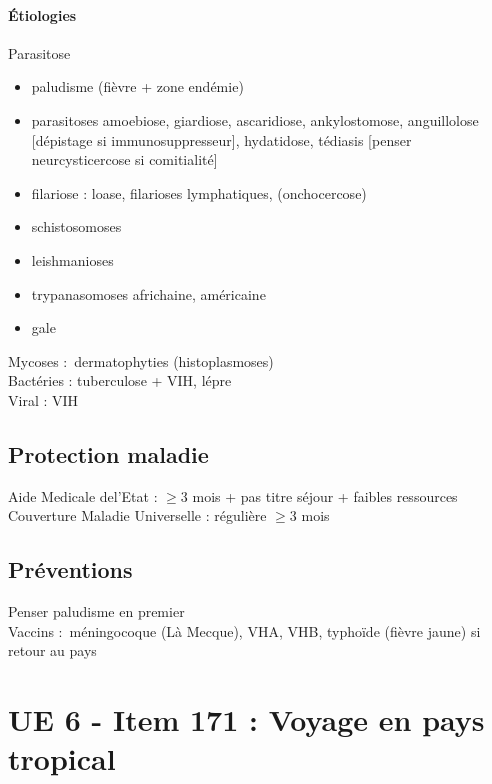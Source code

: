 \documentclass{article}
\newcommand*{\TakeFourierOrnament}[1]{{%
\fontencoding{U}\fontfamily{futs}\selectfont\char#1}}
\newcommand*{\danger}{\TakeFourierOrnament{66}}
\begin{document}
\paragraph{Étiologies} 
Parasitose
\begin{itemize}
  \item paludisme (fièvre + zone endémie)
  \item parasitoses amoebiose, giardiose, ascaridiose, ankylostomose,
    anguillolose [dépistage si immunosuppresseur], hydatidose, tédiasis
    [penser neurcysticercose si comitialité]
  \item filariose : loase, filarioses lymphatiques, (onchocercose)
  \item schistosomoses
  \item leishmanioses
  \item trypanasomoses africhaine, américaine
  \item gale
\end{itemize}
Mycoses : dermatophyties (histoplasmoses)\\
Bactéries : tuberculose + VIH, lépre\\
Viral : VIH\\

\subsection{Protection maladie}
Aide Medicale del'Etat : $\ge 3$ mois + pas titre séjour + faibles ressources \\
Couverture Maladie Universelle : régulière $\ge 3$ mois 

\subsection{Préventions}
\danger Penser paludisme en premier\\
Vaccins : méningocoque (Là Mecque), {VHA, VHB, typhoïde (fièvre jaune)} si
retour au pays

\section{UE 6 - Item 171 : Voyage en pays tropical}%
\end{document}
